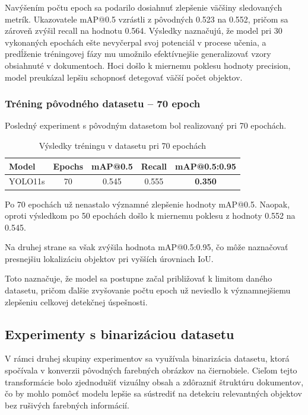             Navýšením počtu epoch sa podarilo dosiahnuť zlepšenie väčšiny sledovaných metrík. Ukazovatele mAP@0.5 vzrástli z pôvodných 0.523 na 0.552, pričom sa zároveň zvýšil recall na hodnotu 0.564. Výsledky naznačujú, že model pri 30 vykonaných epochách ešte nevyčerpal svoj potenciál v procese učenia, a predĺženie tréningovej fázy mu umožnilo efektívnejšie generalizovať vzory obsiahnuté v dokumentoch. Hoci došlo k miernemu poklesu hodnoty precision, model preukázal lepšiu schopnosť detegovať väčší počet objektov.

        \subsubsection{Tréning pôvodného datasetu – 70 epoch}

            Posledný experiment s pôvodným datasetom bol realizovaný pri 70 epochách.

            \begin{table}[H]
                \centering
                \begin{tabular}{|l|c|c|c|c|}
                \hline
                \textbf{Model} & \textbf{Epochs} & \textbf{mAP@0.5} & \textbf{Recall} & \textbf{mAP@0.5:0.95} \\ \hline
                YOLO11s & 70 & 0.545 & 0.555 & \textbf{0.350} \\ \hline
                \end{tabular}
                \caption{Výsledky tréningu v datasetu pri 70 epochách}
                \label{tab:default70}
            \end{table}

            Po 70 epochách už nenastalo významné zlepšenie hodnoty mAP@0.5. Naopak, oproti výsledkom po 50 epochách došlo k miernemu poklesu z hodnoty 0.552 na 0.545. 

            Na druhej strane sa však zvýšila hodnota mAP@0.5:0.95, čo môže naznačovať presnejšiu lokalizáciu objektov pri vyšších úrovniach IoU. 

            Toto naznačuje, že model sa postupne začal približovať k limitom daného datasetu, pričom ďalšie zvyšovanie počtu epoch už neviedlo k významnejšiemu zlepšeniu celkovej detekčnej úspešnosti.
    
    \subsection{Experimenty s binarizáciou datasetu}
            V rámci druhej skupiny experimentov sa využívala binarizácia datasetu, ktorá spočívala v konverzii pôvodných farebných obrázkov na čiernobiele. Cieľom tejto transformácie bolo zjednodušiť vizuálny obsah a zdôrazniť štruktúru dokumentov, čo by mohlo pomôcť modelu lepšie sa sústrediť na detekciu relevantných objektov bez rušivých farebných informácií.

